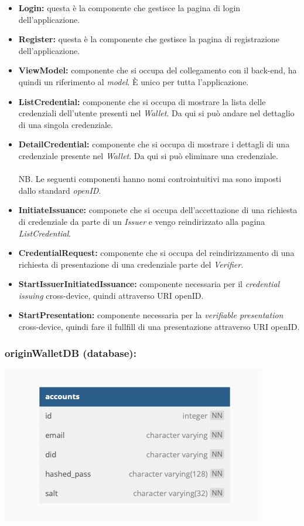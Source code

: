 \begin{itemize}      
    \item \textbf{Login:} questa è la componente che gestisce la pagina di login dell'applicazione. 
    \item \textbf{Register:} questa è la componente che gestisce la pagina di registrazione dell'applicazione.
    \item \textbf{ViewModel:} componente che si occupa del collegamento con il back-end, ha quindi un riferimento al \textit{model}. È unico per tutta l'applicazione.
    \item \textbf{ListCredential:} componente che si occupa di mostrare la lista delle credenziali dell'utente presenti nel \textit{Wallet}. Da qui si può andare nel dettaglio di una singola credenziale.
    \item \textbf{DetailCredential:} componente che si occupa di mostrare i dettagli di una credenziale presente nel \textit{Wallet}. Da qui si può eliminare una credenziale.\\
    \\NB. Le seguenti componenti hanno nomi controintuitivi ma sono imposti dallo standard \textit{openID}.
    \item \textbf{InitiateIssuance:} componete che si  occupa dell'accettazione di una richiesta di credenziale da parte di un \textit{Issuer} e vengo reindirizzato alla pagina \textit{ListCredential}.
    \item \textbf{CredentialRequest:} componente che si occupa del reindirizzamento di una richiesta di presentazione di una credenziale parte del \textit{Verifier}. 
    \item \textbf{StartIssuerInitiatedIssuance:} componente necessaria per il \textit{credential issuing} cross-device, quindi attraverso URI openID.
    \item \textbf{StartPresentation:} componente necessaria per la \textit{verifiable presentation} cross-device, quindi fare il fullfill di una presentazione attraverso URI openID.
\end{itemize}

\subsubsection{originWalletDB (database):}
     \begin{center}
        \includegraphics[scale = 0.6]{./res/img/walletdb.png}
      \end{center}
    
